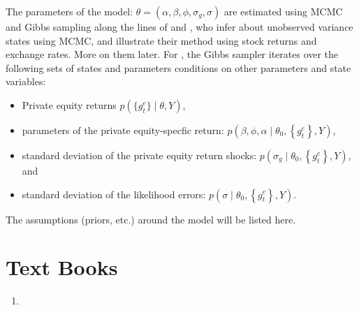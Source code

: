\documentclass[final,5p,times,twocolumn,authoryear]{elsarticle}
\begin{document}
The parameters of the model: $\theta = (\alpha, \beta, \phi, \sigma_g, \sigma)$ are estimated using MCMC and Gibbs sampling along the lines of \cite{Jacquier2004} and \cite{Jacquier1994}, who infer about unobserved variance states using MCMC, and illustrate their method using stock returns and exchange rates. More on them later. For \cite{Ang2014}, the Gibbs sampler iterates over the following sets of states and parameters conditions on other parameters and state variables:
\begin{itemize}[noitemsep]
	\item Private equity returns $p\left( \{ g_t^e \} \mid \theta, Y \right)$, 
	\item parameters of the private equity-specfic return: $p\left( \beta, \phi, \alpha \mid \theta_0, \left\{ g_t^e \right\}, Y \right)$,
	\item standard deviation of the private equity return shocks: $p\left(\sigma_g \mid \theta_0, \left\{ g_t^e \right\}, Y \right)$, and
	\item standard deviation of the likelihood errors: $p\left(\sigma \mid \theta_0, \left\{ g_t^e \right\}, Y \right)$.
\end{itemize}

The assumptions (priors, etc.) around the model will be listed here.

\section{Text Books}

\begin{enumerate}[resume, label=(\roman*)]
	\item \cite{Brooks2019}
\end{enumerate}

 







\end{document}
